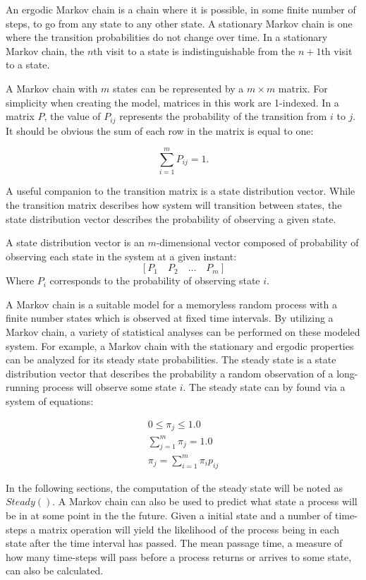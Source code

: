 An ergodic Markov chain is a chain where it is possible, in some finite number of steps, to go from any state to any other state.
A stationary Markov chain is one where the transition probabilities do not change over time.
In a stationary Markov chain, the $n$th visit to a state is indistinguishable from the $n+1$th visit to a state.

A Markov chain with $m$ states can be represented by a $m\times m$ matrix.
For simplicity when creating the model, matrices in this work are 1-indexed.
In a matrix $P$, the value of $P_{ij}$ represents the probability of the transition from $i$ to $j$.
It should be obvious the sum of each row in the matrix is equal to one:

\begin{equation} \sum_{i=1}^{m} P_{ij} = 1. \end{equation}

A useful companion to the transition matrix is a state distribution vector.
While the transition matrix describes how system will transition between states, the state distribution vector describes the probability of observing a given state.

\begin{pdef}
A state distribution vector is an $m$-dimensional vector composed of probability of observing each state in the system at a given instant:
\[ [P_{1} \quad P_{2} \quad \ldots \quad P_{m} ] \]
Where $P_{i}$ corresponds to the probability of observing state $i$.
\end{pdef}

A Markov chain is a suitable model for a memoryless random process with a finite number states which is observed at fixed time intervals.
By utilizing a Markov chain, a variety of statistical analyses can be performed on these modeled system.
For example, a Markov chain with the stationary and ergodic properties can be analyzed for its steady state probabilities.
The steady state is a state distribution vector that describes the probability a random observation of a long-running process will observe some state $i$.
The steady state can by found via a system of equations: \cite{MARKOV3}

\begin{align}
0\leq\pi_j\leq1.0 \\
\sum_{j = 1}^{m}\pi_j = 1.0 \\
\pi_j = \sum_{i=1}^{m} \pi_i p_{ij}
\end{align}

In the following sections, the computation of the steady state will be noted as $Steady()$.
A Markov chain can also be used to predict what state a process will be in at some point in the the future.
Given a initial state and a number of time-steps a matrix operation will yield the likelihood of the process being in each state after the time interval has passed.
The mean passage time, a measure of how many time-steps will pass before a process returns or arrives to some state, can also be calculated.


